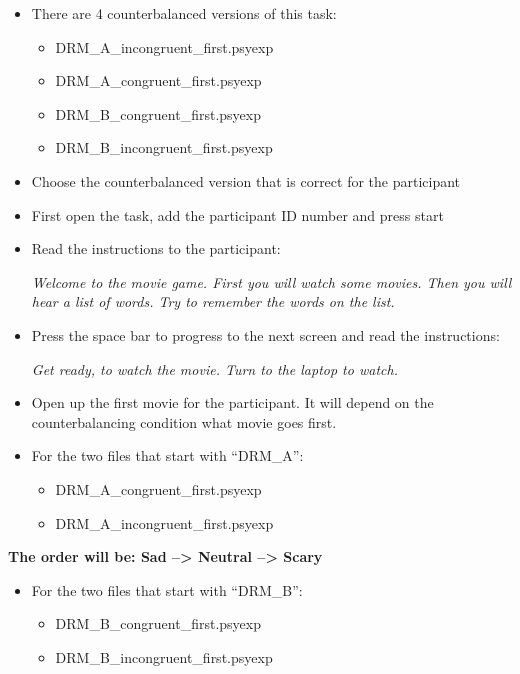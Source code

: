 \documentclass[
]{book}
\providecommand{\tightlist}{%
  \setlength{\itemsep}{0pt}\setlength{\parskip}{0pt}}
\begin{document}
\begin{itemize}
\item
  There are 4 counterbalanced versions of this task:

  \begin{itemize}
  \tightlist
  \item
    DRM\_A\_incongruent\_first.psyexp
  \item
    DRM\_A\_congruent\_first.psyexp
  \item
    DRM\_B\_congruent\_first.psyexp
  \item
    DRM\_B\_incongruent\_first.psyexp
  \end{itemize}
\item
  Choose the counterbalanced version that is correct for the participant
\item
  First open the task, add the participant ID number and press start
\item
  Read the instructions to the participant:

  \emph{Welcome to the movie game. First you will watch some movies. Then you will hear a list of words. Try to remember the words on the list.}
\item
  Press the space bar to progress to the next screen and read the instructions:

  \emph{Get ready, to watch the movie. Turn to the laptop to watch.}
\item
  Open up the first movie for the participant. It will depend on the counterbalancing condition what movie goes first.
\item
  For the two files that start with ``DRM\_A'':

  \begin{itemize}
  \tightlist
  \item
    DRM\_A\_congruent\_first.psyexp
  \item
    DRM\_A\_incongruent\_first.psyexp
  \end{itemize}
\end{itemize}

\textbf{The order will be: Sad --\textgreater{} Neutral --\textgreater{} Scary}

\begin{itemize}
\tightlist
\item
  For the two files that start with ``DRM\_B'':

  \begin{itemize}
  \tightlist
  \item
    DRM\_B\_congruent\_first.psyexp
  \item
    DRM\_B\_incongruent\_first.psyexp
  \end{itemize}
\end{itemize}
\end{document}
